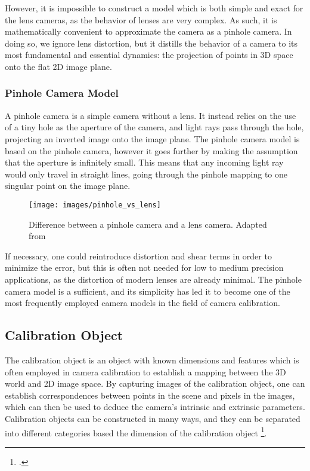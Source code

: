 However, it is impossible to construct a model which is both simple and exact for the lens cameras, as the behavior of lenses are very complex. As such, it is mathematically convenient to approximate the camera as a pinhole camera. In doing so, we ignore lens distortion, but it distills the behavior of a camera to its most fundamental and essential dynamics: the projection of points in 3D space onto the flat 2D image plane. 

\subsubsection{Pinhole Camera Model}

A pinhole camera is a simple camera without a lens. It instead relies on the use of a tiny hole as the aperture of the camera, and light rays pass through the hole, projecting an inverted image onto the image plane. The pinhole camera model is based on the pinhole camera, however it goes further by making the assumption that the aperture is infinitely small. This means that any incoming light ray would only travel in straight lines, going through the pinhole mapping to one singular point on the image plane. 

\begin{figure}[H]
    \centering
    \texttt{[image: images/pinhole\_vs\_lens]}
    \caption{Difference between a pinhole camera and a lens camera. Adapted from \cite{leCameraModel2018}}
\end{figure}

If necessary, one could reintroduce distortion and shear terms in order to minimize the error, but this is often not needed for low to medium precision applications, as the distortion of modern lenses are already minimal. The pinhole camera model is a sufficient, and its simplicity has led it to become one of the most frequently employed camera models in the field of camera calibration. 

\subsection{Calibration Object}

The calibration object is an object with known dimensions and features which is often employed in camera calibration to establish a mapping between the 3D world and 2D image space. By capturing images of the calibration object, one can establish correspondences between points in the scene and pixels in the images, which can then be used to deduce the camera's intrinsic and extrinsic parameters. Calibration objects can be constructed in many ways, and they can be separated into different categories based the dimension of the calibration object \footcite{zhangCameraCalibration2007}. 

